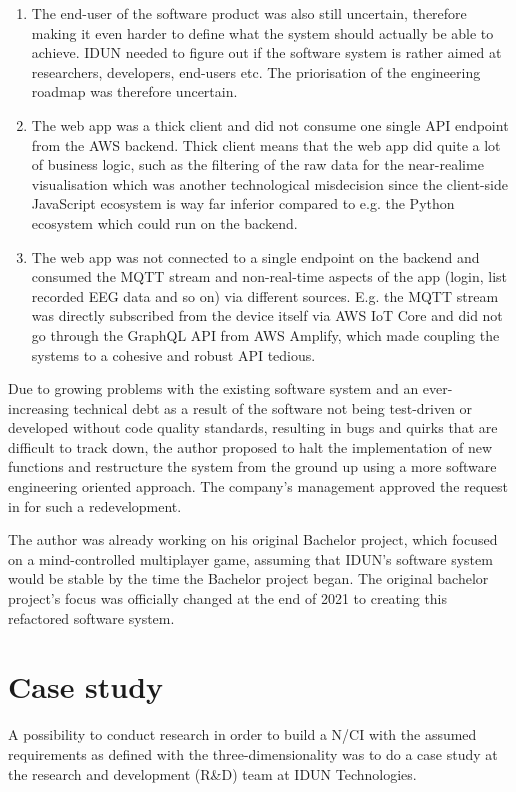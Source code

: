 \begin{enumerate}
   \item The end-user of the software product was also still uncertain, therefore making it even harder to define what the system should actually be able to achieve. IDUN needed to figure out if the software system is rather aimed at researchers, developers, end-users etc. The priorisation of the engineering roadmap was therefore uncertain.
   \item The web app was a thick client and did not consume one single API endpoint from the AWS backend. Thick client means that the web app did quite a lot of business logic, such as the filtering of the raw data for the near-realime visualisation which was another technological misdecision since the client-side JavaScript ecosystem is way far inferior compared to e.g. the Python ecosystem which could run on the backend.
   \item The web app was not connected to a single endpoint on the backend and consumed the MQTT stream and non-real-time aspects of the app (login, list recorded EEG data and so on) via different sources. E.g. the MQTT stream was directly subscribed from the device itself via AWS IoT Core and did not go through the GraphQL API from AWS Amplify, which made coupling the systems to a cohesive and robust API tedious.
\end{enumerate}

Due to growing problems with the existing software system and an ever-increasing technical debt as a result of the software not being test-driven or developed without code quality standards, resulting in bugs and quirks that are difficult to track down, the author proposed to halt the implementation of new functions and restructure the system from the ground up using a more software engineering oriented approach. The company's management approved the request in for such a redevelopment.

The author was already working on his original Bachelor project, which focused on a mind-controlled multiplayer game, assuming that IDUN's software system would be stable by the time the Bachelor project began. The original bachelor project's focus was officially changed at the end of 2021 to creating this refactored software system.

\section{Case study}
\label{chapter3-case-study}

A possibility to conduct research in order to build a N/CI with the assumed requirements as defined with the three-dimensionality was to do a case study at the research and development (R\&D) team at IDUN Technologies.


